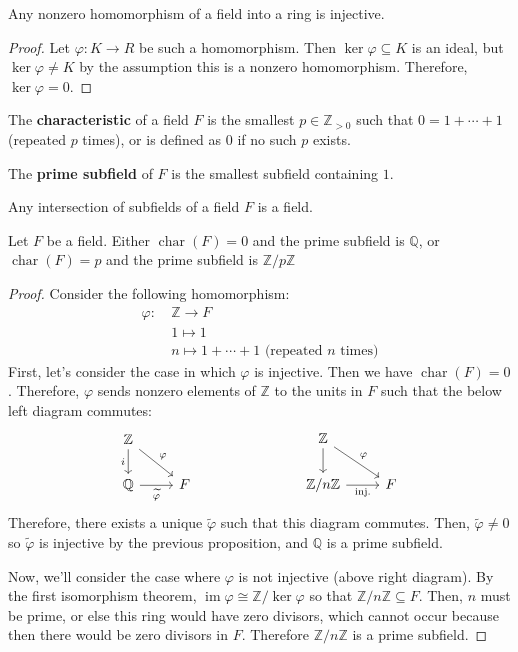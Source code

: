 \documentclass{article}
\theoremstyle{plain}
\newcommand{\Q}{\mathbb{Q}}
\newcommand{\Z}{\mathbb{Z}}
\newcommand{\on}[1]{\operatorname{#1}}
\begin{document}
\begin{theorem}{}{}
Any nonzero homomorphism of a field into a ring is injective.	
\end{theorem}
\begin{proof}
Let $\varphi : K \to R$ be such a homomorphism. Then $\ker\varphi \subseteq K$ is an ideal, but $\ker\varphi \ne K$ by the assumption this is a nonzero homomorphism. Therefore, $\ker\varphi = 0$.	
\end{proof}

\begin{definition}{}{}
The \textbf{characteristic} of a field $F$ is the smallest $p \in \Z_{>0}$ such that $0 = 1+\cdots+1$ (repeated $p$ times), or is defined as $0$ if no such $p$ exists.
\end{definition}

\begin{definition}{}{}
The \textbf{prime subfield} of $F$ is the smallest subfield containing $1$.
\end{definition}

\begin{theorem}{}{}
Any intersection of subfields of a field $F$ is a field.	
\end{theorem}

\begin{theorem}{}{}
Let $F$ be a field. Either $\on{char}(F) = 0$ and the prime subfield is $\Q$, or $\on{char}(F) = p$ and the prime subfield is $\Z/p\Z$	
\end{theorem}
\begin{proof}
Consider the following homomorphism:
\begin{align*}
\varphi : \ &\Z \to F \\
&1 \mapsto 1 \\
&n \mapsto 1 + \cdots + 1 \text{ (repeated $n$ times)}
\end{align*}
First, let's consider the case in which $\varphi$ is injective. Then we have $\on{char}(F) = 0$. Therefore, $\varphi$ sends nonzero elements of $\Z$ to the units in $F$ such that the below left diagram commutes:
	\[ \begin{tikzcd}
	\Z\arrow[swap]{d}{i}\arrow{rd}{\varphi} & {} \\%
	\Q\arrow[swap]{r}{\widetilde{\varphi}} & F
	\end{tikzcd}
	\phantom{testingevenmore}
	\begin{tikzcd}
	\Z\arrow[swap]{d}{}\arrow{rd}{\varphi} & {} \\%
	\Z/n\Z\arrow[swap]{r}{\text{inj.}} & F
	\end{tikzcd}
	\]
	Therefore, there exists a unique $\widetilde{\varphi}$ such that this diagram commutes. Then, $\widetilde{\varphi} \ne 0$ so $\widetilde{\varphi}$ is injective by the previous proposition, and $\Q$ is a prime subfield.
	
	Now, we'll consider the case where $\varphi$ is not injective (above right diagram). By the first isomorphism theorem, $\on{im}\varphi \cong \Z/\ker\varphi$ so that $\Z/n\Z \subseteq F$. Then, $n$ must be prime, or else this ring would have zero divisors, which cannot occur because then there would be zero divisors in $F$. Therefore $\Z/n\Z$ is a prime subfield.
\end{proof}
\end{document}
